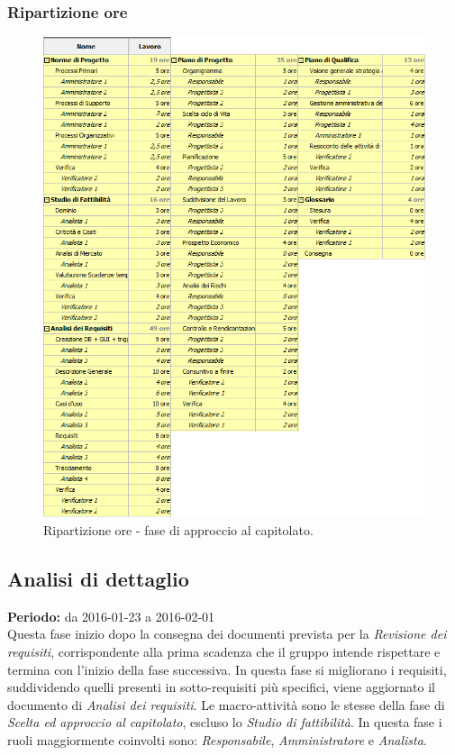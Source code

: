 \documentclass[a4paper]{article}
\begin{document}
			\subsubsection{Ripartizione ore}
				\begin{figure}[H]
					\centering
					\includegraphics[scale=0.6]{ro_approccio}
					\caption{Ripartizione ore - fase di approccio al capitolato.}
				\end{figure}

		\subsection{Analisi di dettaglio}
			\textbf{Periodo:} da 2016-01-23 a 2016-02-01 \\
			Questa fase inizio dopo la consegna dei documenti prevista per la \emph{Revisione dei requisiti}, corrispondente alla prima scadenza 
			che il gruppo intende rispettare e termina con l'inizio della fase successiva. In questa fase si migliorano i requisiti, suddividendo 
			quelli presenti in sotto-requisiti più specifici, viene aggiornato il documento di \emph{Analisi dei requisiti}.
			Le macro-attività sono le stesse della fase di \emph{Scelta ed approccio al capitolato}, escluso lo \emph{Studio di fattibilità}. 
			In questa fase i ruoli maggiormente coinvolti sono: \emph{Responsabile}, \emph{Amministratore} e \emph{Analista}.
\end{document}
